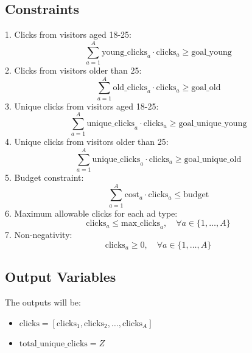 \documentclass{article}
\begin{document}
\subsection*{Constraints}
1. Clicks from visitors aged 18-25:
\[
\sum_{a=1}^{A} \text{young\_clicks}_a \cdot \text{clicks}_a \geq \text{goal\_young}
\]
2. Clicks from visitors older than 25:
\[
\sum_{a=1}^{A} \text{old\_clicks}_a \cdot \text{clicks}_a \geq \text{goal\_old}
\]
3. Unique clicks from visitors aged 18-25:
\[
\sum_{a=1}^{A} \text{unique\_clicks}_a \cdot \text{clicks}_a \geq \text{goal\_unique\_young}
\]
4. Unique clicks from visitors older than 25:
\[
\sum_{a=1}^{A} \text{unique\_clicks}_a \cdot \text{clicks}_a \geq \text{goal\_unique\_old}
\]
5. Budget constraint:
\[
\sum_{a=1}^{A} \text{cost}_a \cdot \text{clicks}_a \leq \text{budget}
\]
6. Maximum allowable clicks for each ad type:
\[
\text{clicks}_a \leq \text{max\_clicks}_a, \quad \forall a \in \{1, \ldots, A\}
\]
7. Non-negativity:
\[
\text{clicks}_a \geq 0, \quad \forall a \in \{1, \ldots, A\}
\]

\subsection*{Output Variables}
The outputs will be:
\begin{itemize}
    \item \( \text{clicks} = [\text{clicks}_1, \text{clicks}_2, \ldots, \text{clicks}_A] \)
    \item \( \text{total\_unique\_clicks} = Z \)
\end{itemize}
\end{document}
